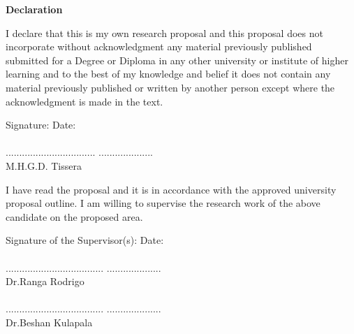 \begin{flushleft}
\large
\textbf{Declaration}
\end{flushleft}
\setlength{\parindent}{0cm}

I declare that this is my own research proposal and this proposal does not incorporate without acknowledgment any material previously published submitted for a Degree or Diploma in any other university or institute of higher learning and to the best of my knowledge and belief it does not contain any material previously published or written by another person except where the acknowledgment is made in the text.

Signature:  \hspace{8cm}  Date:\\
\\
................................. \hspace{5.75cm} ....................\\
M.H.G.D. Tissera

I have read the proposal and it is in accordance with the approved university proposal outline. I am willing to supervise the research work of the above candidate on the proposed area.

Signature of the Supervisor(s):  \hspace{4.25cm}  Date:\\
\\
.................................... \hspace{5.25cm} ....................\\
Dr.Ranga Rodrigo\\
\\
.................................... \hspace{5.25cm} ....................\\
Dr.Beshan Kulapala\\
\\


